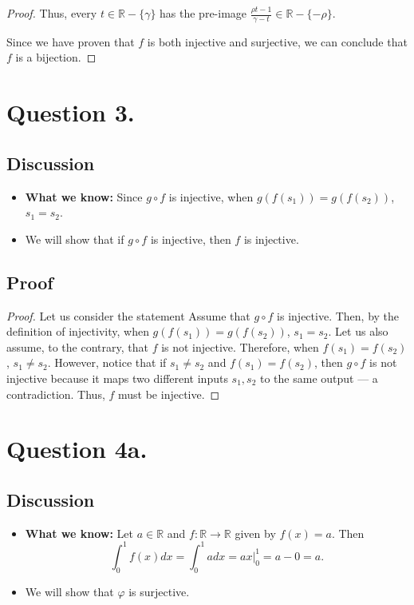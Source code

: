 \documentclass{article}
\begin{document}
\begin{proof}
    \noindent Thus, every $ t \in \mathbb{R}-\{\gamma\} $ has the pre-image $ \frac{\rho t - 1}{\gamma - t} \in \mathbb{R}-\{-\rho\} $.

    \noindent Since we have proven that $ f $ is both injective and surjective, we can conclude that $ f $ is a bijection.
\end{proof}

\section*{Question 3.}
\subsection*{Discussion}
\begin{itemize}
    \item \textbf{What we know:} Since $ g \circ f $ is injective, when $ g(f(s_1)) = g(f(s_2)) $, $ s_1 = s_2 $.
    \item We will show that if $ g \circ f $ is injective, then $ f $ is injective.
\end{itemize}

\subsection*{Proof}
\begin{proof}
    Let us consider the statement  Assume that $ g \circ f $ is injective. Then, by the definition of injectivity, when $ g(f(s_1)) = g(f(s_2)) $, $ s_1 = s_2 $. Let us also assume, to the contrary,
    that $ f $ is not injective. Therefore, when $ f(s_1) = f(s_2) $, $ s_1 \neq s_2 $. However, notice that if $ s_1 \neq s_2 $ and $ f(s_1) = f(s_2) $, then $ g \circ f $ is not injective because it maps two different inputs $ s_1, s_2 $ to the same output --- a contradiction. Thus, $ f $ must be injective.
\end{proof}

\section*{Question 4a.}
\subsection*{Discussion}
\begin{itemize}
    \item \textbf{What we know:} Let $ a \in \mathbb{R} $ and $ f : \mathbb{R} \rightarrow \mathbb{R} $ given by $ f(x) = a $. Then 
    \[
        \int_{0}^{1} f(x) dx = \int_{0}^{1} a dx = ax \Bigr|_{0}^{1} = a - 0 = a.
    \]
    \item We will show that $ \varphi $ is surjective.
\end{itemize}
\end{document}
